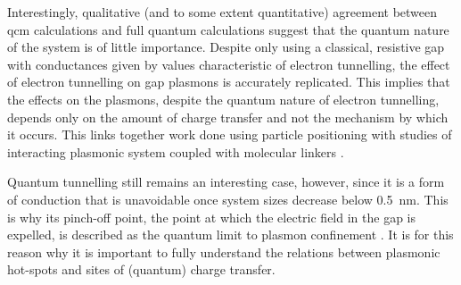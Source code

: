 \documentclass{article}
\begin{document}
Interestingly, qualitative (and to some extent quantitative) agreement between \gls{qcm} calculations and full quantum calculations suggest that the quantum nature of the system is of little importance. Despite only using a classical, resistive gap with conductances given by values characteristic of electron tunnelling, the effect of electron tunnelling on gap plasmons is accurately replicated. This implies that the effects on the plasmons, despite the quantum nature of electron tunnelling, depends only on the amount of charge transfer and not the mechanism by which it occurs. This links together work done using particle positioning \cite{savage2012, scholl2013} with studies of interacting plasmonic system coupled with molecular linkers \cite{tan2014, benz2014, cha2014}.

Quantum tunnelling still remains an interesting case, however, since it is a form of conduction that is unavoidable once system sizes decrease below \SI{0.5}{nm}. This is why its pinch-off point, the point at which the electric field in the gap is expelled, is described as the quantum limit to plasmon confinement \cite{savage2012}. It is for this reason why it is important to fully understand the relations between plasmonic hot-spots and sites of (quantum) charge transfer.
\end{document}
